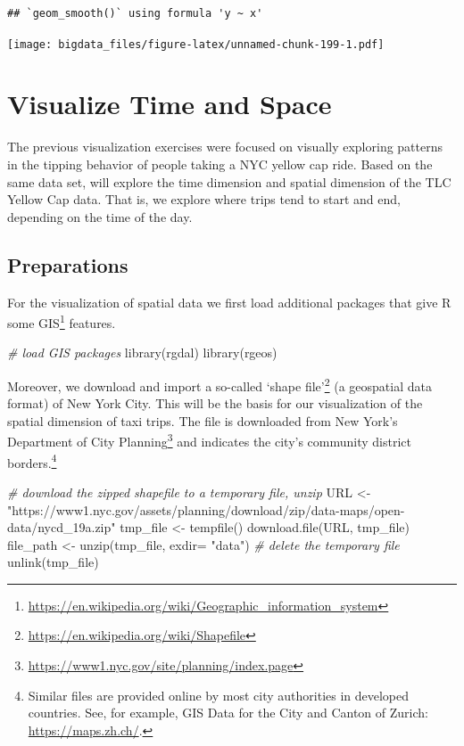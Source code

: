 \documentclass[
  12pt,
]{style/krantz}
\newenvironment{Shaded}{\begin{snugshade}}{\end{snugshade}}
\newcommand{\AttributeTok}[1]{\textcolor[rgb]{0.77,0.63,0.00}{#1}}
\newcommand{\CommentTok}[1]{\textcolor[rgb]{0.56,0.35,0.01}{\textit{#1}}}
\newcommand{\FunctionTok}[1]{\textcolor[rgb]{0.00,0.00,0.00}{#1}}
\newcommand{\NormalTok}[1]{#1}
\newcommand{\OtherTok}[1]{\textcolor[rgb]{0.56,0.35,0.01}{#1}}
\newcommand{\StringTok}[1]{\textcolor[rgb]{0.31,0.60,0.02}{#1}}
\renewcommand{\href}[2]{#2\footnote{\url{#1}}}
\begin{document}
\begin{verbatim}
## `geom_smooth()` using formula 'y ~ x'
\end{verbatim}

\texttt{[image: bigdata\_files/figure-latex/unnamed-chunk-199-1.pdf]}

\hypertarget{visualize-time-and-space}{%
\section{Visualize Time and Space}\label{visualize-time-and-space}}

The previous visualization exercises were focused on visually exploring patterns in the tipping behavior of people taking a NYC yellow cap ride. Based on the same data set, will explore the time dimension and spatial dimension of the TLC Yellow Cap data. That is, we explore where trips tend to start and end, depending on the time of the day.

\hypertarget{preparations}{%
\subsection{Preparations}\label{preparations}}

For the visualization of spatial data we first load additional packages that give R some \href{https://en.wikipedia.org/wiki/Geographic_information_system}{GIS} features.

\begin{Shaded}
\begin{Highlighting}[]
\CommentTok{\# load GIS packages}
\FunctionTok{library}\NormalTok{(rgdal)}
\FunctionTok{library}\NormalTok{(rgeos)}
\end{Highlighting}
\end{Shaded}

Moreover, we download and import a so-called \href{https://en.wikipedia.org/wiki/Shapefile}{`shape file'} (a geospatial data format) of New York City. This will be the basis for our visualization of the spatial dimension of taxi trips. The file is downloaded from \href{https://www1.nyc.gov/site/planning/index.page}{New York's Department of City Planning} and indicates the city's community district borders.\footnote{Similar files are provided online by most city authorities in developed countries. See, for example, GIS Data for the City and Canton of Zurich: \url{https://maps.zh.ch/}.}

\begin{Shaded}
\begin{Highlighting}[]
\CommentTok{\# download the zipped shapefile to a temporary file, unzip}
\NormalTok{URL }\OtherTok{\textless{}{-}} \StringTok{"https://www1.nyc.gov/assets/planning/download/zip/data{-}maps/open{-}data/nycd\_19a.zip"}
\NormalTok{tmp\_file }\OtherTok{\textless{}{-}} \FunctionTok{tempfile}\NormalTok{()}
\FunctionTok{download.file}\NormalTok{(URL, tmp\_file)}
\NormalTok{file\_path }\OtherTok{\textless{}{-}} \FunctionTok{unzip}\NormalTok{(tmp\_file, }\AttributeTok{exdir=} \StringTok{"data"}\NormalTok{)}
\CommentTok{\# delete the temporary file}
\FunctionTok{unlink}\NormalTok{(tmp\_file)}
\end{Highlighting}
\end{Shaded}
\end{document}
